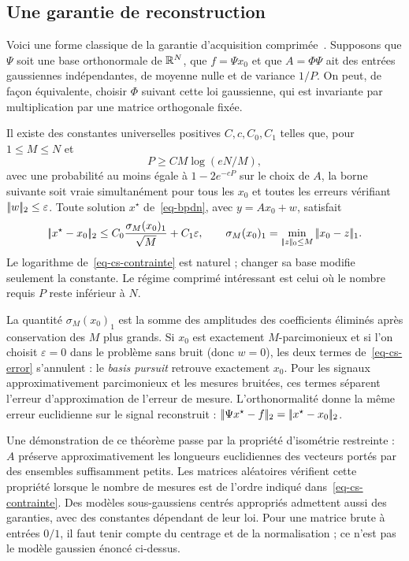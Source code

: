 \subsection{Une garantie de reconstruction}
Voici une forme classique de la garantie d'acquisition comprimée~\cite{candes2006stable,donoho2006compressed}. Supposons que $\Psi$ soit une base orthonormale de $\mathbb{R}^N$, que $f=\Psi x_0$ et que $A=\Phi\Psi$ ait des entrées gaussiennes indépendantes, de moyenne nulle et de variance $1/P$. On peut, de façon équivalente, choisir $\Phi$ suivant cette loi gaussienne, qui est invariante par multiplication par une matrice orthogonale fixée.

Il existe des constantes universelles positives $C,c,C_0,C_1$ telles que, pour $1\le M\le N$ et
\begin{equation}\label{eq-cs-contrainte}
 P\ge C M\log(eN/M),
\end{equation}
avec une probabilité au moins égale à $1-2e^{-cP}$ sur le choix de $A$, la borne suivante soit vraie simultanément pour tous les $x_0$ et toutes les erreurs vérifiant $|\!| w |\!|_2\le\varepsilon$. Toute solution $x^\star$ de~\eqref{eq-bpdn}, avec $y=Ax_0+w$, satisfait
\begin{equation}\label{eq-cs-error}
 |\!| x^\star-x_0 |\!|_2
 \le C_0\frac{\sigma_M(x_0)_1}{\sqrt M}+C_1\varepsilon,
 \qquad
 \sigma_M(x_0)_1=\min_{|\!| z |\!|_0\le M}|\!| x_0-z |\!|_1.
\end{equation}
Le logarithme de~\eqref{eq-cs-contrainte} est naturel ; changer sa base modifie seulement la constante. Le régime comprimé intéressant est celui où le nombre requis $P$ reste inférieur à $N$.

La quantité $\sigma_M(x_0)_1$ est la somme des amplitudes des coefficients éliminés après conservation des $M$ plus grands. Si $x_0$ est exactement $M$-parcimonieux et si l'on choisit $\varepsilon=0$ dans le problème sans bruit (donc $w=0$), les deux termes de~\eqref{eq-cs-error} s'annulent : le \emph{basis pursuit} retrouve exactement $x_0$. Pour les signaux approximativement parcimonieux et les mesures bruitées, ces termes séparent l'erreur d'approximation de l'erreur de mesure. L'orthonormalité donne la même erreur euclidienne sur le signal reconstruit : $|\!| \Psi x^\star-f |\!|_2=|\!| x^\star-x_0 |\!|_2$.

Une démonstration de ce théorème passe par la propriété d'isométrie restreinte : $A$ préserve approximativement les longueurs euclidiennes des vecteurs portés par des ensembles suffisamment petits. Les matrices aléatoires vérifient cette propriété lorsque le nombre de mesures est de l'ordre indiqué dans~\eqref{eq-cs-contrainte}. Des modèles sous-gaussiens centrés appropriés admettent aussi des garanties, avec des constantes dépendant de leur loi. Pour une matrice brute à entrées $0/1$, il faut tenir compte du centrage et de la normalisation ; ce n'est pas le modèle gaussien énoncé ci-dessus.

